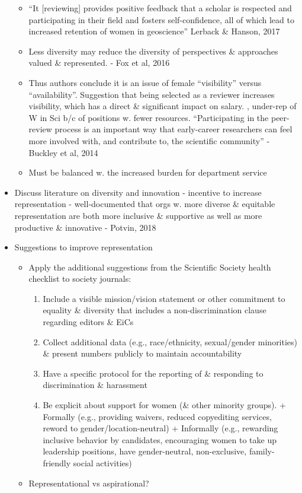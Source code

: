 \documentclass[11pt,]{article}
\providecommand{\tightlist}{%
  \setlength{\itemsep}{0pt}\setlength{\parskip}{0pt}}
\begin{document}
\begin{itemize}
  \begin{itemize}
  \tightlist
  \item
    ``It {[}reviewing{]} provides positive feedback that a scholar is
    respected and participating in their field and fosters
    self-confidence, all of which lead to increased retention of women
    in geoscience'' Lerback \& Hanson, 2017
  \item
    Less diversity may reduce the diversity of perspectives \&
    approaches valued \& represented. - Fox et al, 2016
  \item
    Thus authors conclude it is an issue of female ``visibility'' versus
    ``availability''. Suggestion that being selected as a reviewer
    increases visibility, which has a direct \& significant impact on
    salary. , under-rep of W in Sci b/c of positions w. fewer resources.
    ``Participating in the peer-review process is an important way that
    early-career researchers can feel more involved with, and contribute
    to, the scientific community'' - Buckley et al, 2014
  \item
    Must be balanced w. the increased burden for department service
  \end{itemize}
\item
  Discuss literature on diversity and innovation - incentive to increase
  representation - well-documented that orgs w. more diverse \&
  equitable representation are both more inclusive \& supportive as well
  as more productive \& innovative - Potvin, 2018
\item
  Suggestions to improve representation

  \begin{itemize}
  \tightlist
  \item
    Apply the additional suggestions from the Scientific Society health
    checklist to society journals:

    \begin{enumerate}
    \def\labelenumi{\arabic{enumi}.}
    \tightlist
    \item
      Include a visible mission/vision statement or other commitment to
      equality \& diversity that includes a non-discrimination clause
      regarding editors \& EiCs
    \item
      Collect additional data (e.g., race/ethnicity, sexual/gender
      minorities) \& present numbers publicly to maintain accountability
    \item
      Have a specific protocol for the reporting of \& responding to
      discrimination \& harassment
    \item
      Be explicit about support for women (\& other minority groups). +
      Formally (e.g., providing waivers, reduced copyediting services,
      reword to gender/location-neutral) + Informally (e.g., rewarding
      inclusive behavior by candidates, encouraging women to take up
      leadership positions, have gender-neutral, non-exclusive,
      family-friendly social activities)
    \end{enumerate}
  \item
    Representational vs aspirational?


\end{itemize}
\end{itemize}
\end{document}
